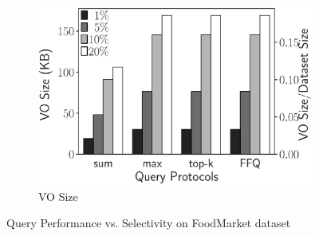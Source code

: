 \begin{figure}[t]
\begin{subfigure}[b]{.33\linewidth}
    \includegraphics[height=\ht\figbox]{exp-figs/aggregate-queries/foodmarket_vo.eps}
    \caption{VO Size}
  \end{subfigure}
  \caption{Query Performance vs. Selectivity on FoodMarket dataset}\label{fig:aggregate-queries:foodmarket}


\end{figure}
